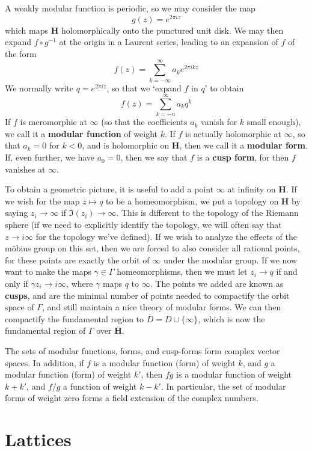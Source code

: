 A weakly modular function is periodic, so we may consider the map
%
\[ g(z) = e^{2 \pi i z} \]
%
which maps $\mathbf{H}$ holomorphically onto the punctured unit disk. We may then expand $f \circ g^{-1}$ at the origin in a Laurent series, leading to an expansion of $f$ of the form
%
\[ f(z) = \sum_{k = -\infty}^\infty a_k e^{2 \pi i k z} \]
%
We normally write $q = e^{2 \pi i z}$, so that we `expand $f$ in $q$' to obtain
%
\[ f(z) = \sum_{k = -n}^\infty a_k q^k \]
%
If $f$ is meromorphic at $\infty$ (so that the coefficients $a_k$ vanish for $k$ small enough), we call it a {\bf modular function} of weight $k$. If $f$ is actually holomorphic at $\infty$, so that $a_k = 0$ for $k < 0$, and is holomorphic on $\mathbf{H}$, then we call it a {\bf modular form}. If, even further, we have $a_0 = 0$, then we say that $f$ is a {\bf cusp form}, for then $f$ vanishes at $\infty$.

To obtain a geometric picture, it is useful to add a point $\infty$ at infinity on $\mathbf{H}$. If we wish for the map $z \mapsto q$ to be a homeomorphism, we put a topology on $\mathbf{H}$ by saying $z_i \to \infty$ if $\Im(z_i) \to \infty$. This is different to the topology of the Riemann sphere (if we need to explicitly identify the topology, we will often say that $z \to i \infty$ for the topology we've defined). If we wish to analyze the effects of the m\"{o}bius group on this set, then we are forced to also consider all rational points, for these points are exactly the orbit of $\infty$ under the modular group. If we now want to make the maps $\gamma \in \Gamma$ homeomorphisms, then we must let $z_i \to q$ if and only if $\gamma z_i \to i \infty$, where $\gamma$ maps $q$ to $\infty$. The points we added are known as {\bf cusps}, and are the minimal number of points needed to compactify the orbit space of $\Gamma$, and still maintain a nice theory of modular forms. We can then compactify the fundamental region to $\overline{D} = D \cup \{ \infty \}$, which is now the fundamental region of $\Gamma$ over $\overline{\mathbf{H}}$.

The sets of modular functions, forms, and cusp-forms form complex vector spaces. In addition, if $f$ is a modular function (form) of weight $k$, and $g$ a modular function (form) of weight $k'$, then $fg$ is a modular function of weight $k + k'$, and $f/g$ a function of weight $k - k'$. In particular, the set of modular forms of weight zero forms a field extension of the complex numbers.

\section{Lattices}

